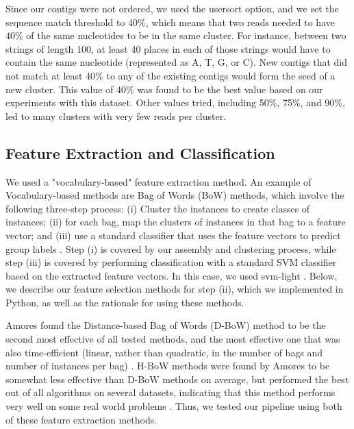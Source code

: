 Since our contigs were not ordered, we used the usersort option, and we set the sequence match threshold to 40\%, which means that two reads needed to have 40\% of the same nucleotides to be in the same cluster. For instance, between two strings of length 100, at least 40 places in each of those strings would have to contain the same nucleotide (represented as A, T, G, or C). New contigs that did not match at least 40\% to any of the existing contigs would form the seed of a new cluster. This value of 40\% was found to be the best value based on our experiments with this dataset. Other values tried, including 50\%, 75\%, and 90\%, led to many clusters with very few reads per cluster.

\subsection{Feature Extraction and Classification}
\label{feature-extraction}

We used a "vocabulary-based" feature extraction method. An example of Vocabulary-based methods are Bag of Words (BoW) methods, which involve the following three-step process: (i) Cluster the instances to create classes of instances; (ii) for each bag, map the clusters of instances in that bag to a feature vector; and (iii) use a standard classifier that uses the feature vectors to predict group labels \cite{amores13}. Step (i) is covered by our assembly and clustering process, while step (iii) is covered by performing classification with a standard SVM classifier based on the extracted feature vectors. In this case, we used svm-light \cite{joachims08}. Below, we describe our feature selection methods for step (ii), which we implemented in Python, as well as the rationale for using these methods. 

Amores found the Distance-based Bag of Words (D-BoW) method to be the second most effective of all tested methods, and the most effective one that was also time-efficient (linear, rather than quadratic, in the number of bags and number of instances per bag) \cite{amores13}. H-BoW methods were found by Amores to be somewhat less effective than D-BoW methods on average, but performed the best out of all algorithms on several datasets, indicating that this method performs very well on some real world problems \cite{amores13}. Thus, we tested our pipeline using both of these feature extraction methods. 

